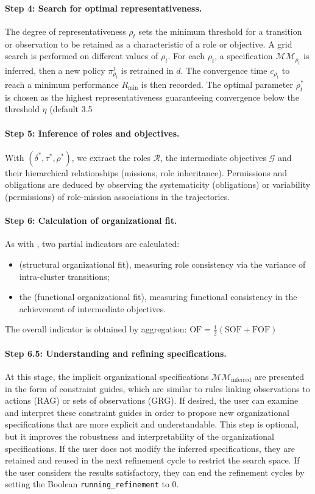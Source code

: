 \paragraph{Step 4: Search for optimal representativeness.}
The degree of representativeness $\rho_t$ sets the minimum threshold for a transition or observation to be retained as a characteristic of a role or objective.
A grid search is performed on different values of $\rho_t$.
For each $\rho_t$, a specification $\mathcal{MM}_{\rho_t}$ is inferred, then a new policy $\pi^j_{\rho_t}$ is retrained in $d$.
The convergence time $c_{\rho_t}$ to reach a minimum performance $R_{\min}$ is then recorded.
The optimal parameter $\rho_t^*$ is chosen as the highest representativeness guaranteeing convergence below the threshold $\eta$ (default 3.5%

\paragraph{Step 5: Inference of roles and objectives. }
With $(\delta^*, \tau^*, \rho^*)$, we extract the roles $\mathcal{R}$, the intermediate objectives $\mathcal{G}$ and their hierarchical relationships (missions, role inheritance).
Permissions and obligations are deduced by observing the systematicity (obligations) or variability (permissions) of role-mission associations in the trajectories.

\paragraph{Step 6: Calculation of organizational fit.}
As with , two partial indicators are calculated:
\begin{itemize}
  \item \textbf{} (structural organizational fit), measuring role consistency via the variance of intra-cluster transitions;
  \item the \textbf{} (functional organizational fit), measuring functional consistency in the achievement of intermediate objectives.
\end{itemize}
The overall indicator is obtained by aggregation:
$\text{OF} = \frac{1}{2}(\text{SOF} + \text{FOF})$

\paragraph{Step 6.5: Understanding and refining specifications.}
At this stage, the implicit organizational specifications $\mathcal{MM}_{\text{inferred}}$ are presented in the form of constraint guides, which are similar to rules linking observations to actions (RAG) or sets of observations (GRG). If desired, the user can examine and interpret these constraint guides in order to propose new organizational specifications that are more explicit and understandable. This step is optional, but it improves the robustness and interpretability of the organizational specifications. If the user does not modify the inferred specifications, they are retained and reused in the next refinement cycle to restrict the search space. If the user considers the results satisfactory, they can end the refinement cycles by setting the Boolean \texttt{running\_refinement} to 0.

